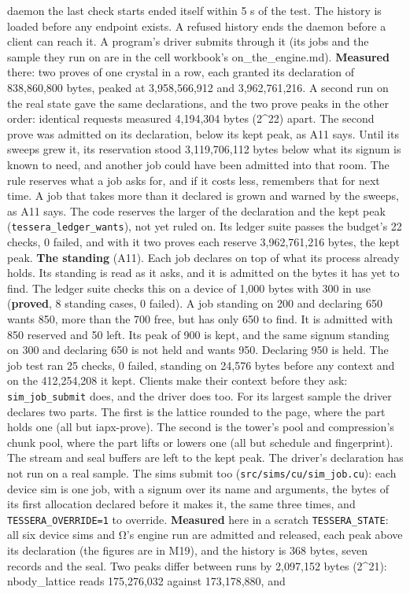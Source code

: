 \begin{description}
daemon the last check starts ended itself within 5 s of the test. The history is loaded before any endpoint exists. A refused history ends the daemon before a client can reach it. A program's driver submits through it (its jobs and the sample they run on are in the cell workbook's on\_\allowbreak{}the\_\allowbreak{}engine.md). \textbf{Measured} there: two proves of one crystal in a row, each granted its declaration of 838,860,800 bytes, peaked at 3,958,566,912 and 3,962,761,216. A second run on the real state gave the same declarations, and the two prove peaks in the other order: identical requests measured 4,194,304 bytes (2\textasciicircum{}22) apart. The second prove was admitted on its declaration, below its kept peak, as A11 says. Until its sweeps grew it, its reservation stood 3,119,706,112 bytes below what its signum is known to need, and another job could have been admitted into that room. The rule reserves what a job asks for, and if it costs less, remembers that for next time. A job that takes more than it declared is grown and warned by the sweeps, as A11 says. The code reserves the larger of the declaration and the kept peak (\texttt{tessera\_\allowbreak{}ledger\_\allowbreak{}wants}), not yet ruled on. Its ledger suite passes the budget's 22 checks, 0 failed, and with it two proves each reserve 3,962,761,216 bytes, the kept peak. \textbf{The standing} (A11). Each job declares on top of what its process already holds. Its standing is read as it asks, and it is admitted on the bytes it has yet to find. The ledger suite checks this on a device of 1,000 bytes with 300 in use (\textbf{proved}, 8 standing cases, 0 failed). A job standing on 200 and declaring 650 wants 850, more than the 700 free, but has only 650 to find. It is admitted with 850 reserved and 50 left. Its peak of 900 is kept, and the same signum standing on 300 and declaring 650 is not held and wants 950. Declaring 950 is held. The job test ran 25 checks, 0 failed, standing on 24,576 bytes before any context and on the 412,254,208 it kept. Clients make their context before they ask: \texttt{sim\_\allowbreak{}job\_\allowbreak{}submit} does, and the driver does too. For its largest sample the driver declares two parts. The first is the lattice rounded to the page, where the part holds one (all but iapx-prove). The second is the tower's pool and compression's chunk pool, where the part lifts or lowers one (all but schedule and fingerprint). The stream and seal buffers are left to the kept peak. The driver's declaration has not run on a real sample. The sims submit too (\texttt{src/\allowbreak{}sims/\allowbreak{}cu/\allowbreak{}sim\_\allowbreak{}job.\allowbreak{}cu}): each device sim is one job, with a signum over its name and arguments, the bytes of its first allocation declared before it makes it, the same three times, and \texttt{TESSERA\_\allowbreak{}OVERRIDE=1} to override. \textbf{Measured} here in a scratch \texttt{TESSERA\_\allowbreak{}STATE}: all six device sims and Ω's engine run are admitted and released, each peak above its declaration (the figures are in M19), and the history is 368 bytes, seven records and the seal. Two peaks differ between runs by 2,097,152 bytes (2\textasciicircum{}21): nbody\_\allowbreak{}lattice reads 175,276,032 against 173,178,880, and 
\end{description}
